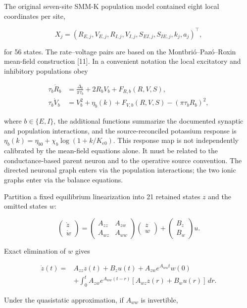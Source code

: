 \documentclass[
  11pt,
]{article}
\begin{document}
The original seven-site SMM-K population model contained eight local
coordinates per site,

\[X_j=(R_{E,j},V_{E,j},R_{I,j},V_{I,j},S_{EI,j},S_{IE,j},k_j,a_j)^\top,\]

for 56 states. The rate--voltage pairs are based on the
Montbrió--Pazó--Roxin mean-field construction {[}11{]}. In a convenient
notation the local excitatory and inhibitory populations obey

\[\begin{aligned}
\tau_b\dot R_b&=\frac{\Delta_b}{\pi\tau_b}+2R_bV_b+F_{R,b}(R,V,S),\\
\tau_b\dot V_b&=V_b^2+\eta_b(k)+F_{V,b}(R,V,S)-(\pi\tau_bR_b)^2,
\end{aligned}\]

where \(b\in\{E,I\}\), the additional functions summarize the documented
synaptic and population interactions, and the source-reconciled
potassium response is \(\eta_b(k)=\eta_{b0}+\chi_b\log(1+k/K_{e0})\).
This response map is not independently calibrated by the mean-field
equations alone. It must be related to the conductance-based parent
neuron and to the operative source convention. The directed neuronal
graph enters via the population interactions; the two ionic graphs enter
via the balance equations.

Partition a fixed equilibrium linearization into 21 retained states
\(z\) and the omitted states \(w\):

\[\begin{pmatrix}\dot z\\\dot w\end{pmatrix}=\begin{pmatrix}A_{zz}&A_{zw}\\A_{wz}&A_{ww}\end{pmatrix}\begin{pmatrix}z\\w\end{pmatrix}+\begin{pmatrix}B_z\\B_w\end{pmatrix}u.\]

Exact elimination of \(w\) gives

\[\begin{aligned}
\dot z(t)={}&A_{zz}z(t)+B_zu(t)+A_{zw}e^{A_{ww}t}w(0)\\
&+\int_0^t A_{zw}e^{A_{ww}(t-r)}[A_{wz}z(r)+B_wu(r)]\,dr .
\end{aligned}\]

Under the quasistatic approximation, if \(A_{ww}\) is invertible,
\end{document}

